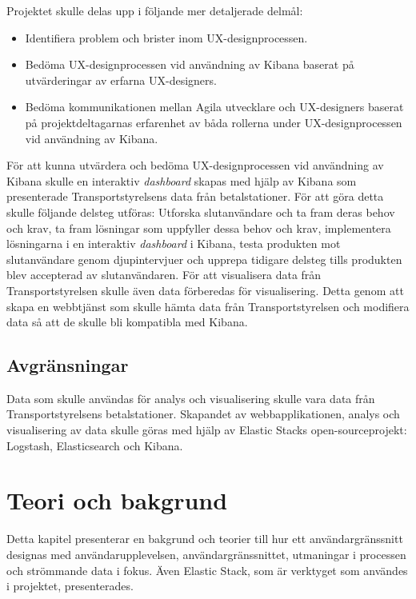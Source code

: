 \documentclass[12pt]{kththesis}
\begin{document}
Projektet skulle delas upp i följande mer detaljerade delmål:

\begin{itemize}

\item Identifiera problem och brister inom UX-designprocessen. 

\item Bedöma UX-designprocessen vid användning av Kibana baserat på utvärderingar av erfarna UX-designers.

\item Bedöma kommunikationen mellan Agila utvecklare och UX-designers baserat på projektdeltagarnas erfarenhet av båda rollerna under UX-designprocessen vid användning av Kibana.
\end{itemize} 

För att kunna utvärdera och bedöma UX-designprocessen vid användning av Kibana skulle en interaktiv \textit{dashboard} skapas med hjälp av Kibana som presenterade Transportstyrelsens data från betalstationer. För att göra detta skulle följande delsteg utföras: Utforska slutanvändare och ta fram deras behov och krav, ta fram lösningar som uppfyller dessa behov och krav, implementera lösningarna i en interaktiv \textit{dashboard} i Kibana, testa produkten mot slutanvändare genom djupintervjuer och upprepa tidigare delsteg tills produkten blev accepterad av slutanvändaren. För att visualisera data från Transportstyrelsen skulle även data förberedas för visualisering. Detta genom att skapa en webbtjänst som skulle hämta data från Transportstyrelsen och modifiera data så att de skulle bli kompatibla med Kibana.

\section{Avgränsningar}
Data som skulle användas för analys och visualisering skulle vara data från Transportstyrelsens betalstationer. Skapandet av webbapplikationen, analys och visualisering av data skulle göras med hjälp av Elastic Stacks open-sourceprojekt: Logstash, Elasticsearch och Kibana. 

\afterpage{\null\newpage}

\chapter{Teori och bakgrund}

Detta kapitel presenterar en bakgrund och teorier till hur ett användargränssnitt designas med användarupplevelsen, användargränssnittet, utmaningar i processen och strömmande data i fokus. Även Elastic Stack, som är verktyget som användes i projektet, presenterades.
\end{document}
